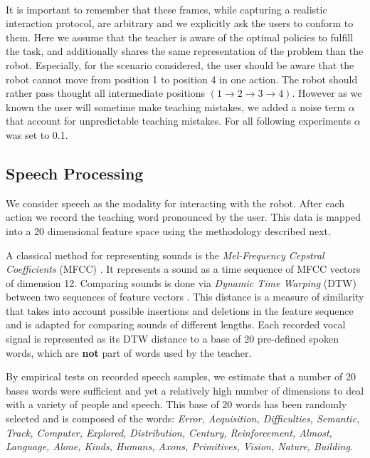 \paragraph{} It is important to remember that these frames, while capturing a realistic interaction protocol, are arbitrary and we explicitly ask the users to conform to them. Here we assume that the teacher is aware of the optimal policies to fulfill the task, and additionally shares the same representation of the problem than the robot. Especially, for the scenario considered, the user should be aware that the robot cannot move from position 1 to position 4 in one action. The robot should rather pass thought all intermediate positions $(1 \rightarrow 2 \rightarrow 3 \rightarrow 4)$. However as we known the user will sometime make teaching mistakes, we added a noise term $\alpha$ that account for unpredictable teaching mistakes. For all following experiments $\alpha$ was set to 0.1.

\subsection{Speech Processing}
\label{chapter:lfui:speechdata}

We consider speech as the modality for interacting with the robot. After each action we record the teaching word pronounced by the user. This data is mapped into a 20 dimensional feature space using the methodology described next.  

A classical method for representing sounds is the \textit{Mel-Frequency Cepstral Coefficients} (MFCC) \cite{zheng2001comparison}. It represents a sound as a time sequence of MFCC vectors of dimension 12. Comparing sounds is done via \textit{Dynamic Time Warping} (DTW) between two sequences of feature vectors \cite{sakoe1978dynamic}. This distance is a measure of similarity that takes into account possible insertions and deletions in the feature sequence and is adapted for comparing sounds of different lengths. Each recorded vocal signal is represented as its DTW distance to a base of 20 pre-defined spoken words, which are \textbf{not} part of words used by the teacher.

By empirical tests on recorded speech samples, we estimate that a number of 20 bases words were sufficient and yet a relatively high number of dimensions to deal with a variety of people and speech. This base of 20 words has been randomly selected and is composed of the words:\emph{ \footnotesize{Error, Acquisition, Difficulties, Semantic, Track, Computer, Explored, Distribution, Century, Reinforcement, Almost, Language, Alone, Kinds, Humans, Axons, Primitives, Vision, Nature, Building}}.

